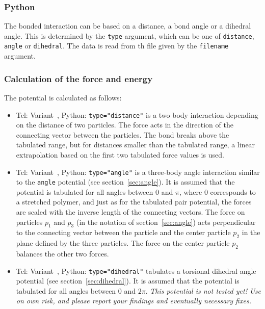 \subsubsection{Python}
\begin{pysyntax}
  \begin{features}
  \end{features}
\end{pysyntax}

The bonded interaction can be based on a distance, a bond angle or a dihedral angle. This is determined by the \texttt{type} argument, which can be one of \texttt{distance}, \texttt{angle} or \texttt{dihedral}. The data is read from th file given by the \texttt{filename} argument.

\subsubsection{Calculation of the force and energy}

The potential is calculated as follows:
\begin{itemize}
\item Tcl: Variant~, Python: \texttt{type="distance"} is a two body interaction depending on the distance of
  two particles. The force acts in the direction of the connecting vector
  between the particles. The bond breaks above the tabulated range, but for
  distances smaller than the tabulated range, a linear extrapolation based on
  the first two tabulated force values is used.
\item Tcl: Variant~, Python: \texttt{type="angle"} is a three-body angle interaction similar to the
  \texttt{angle} potential (see section~\ref{sec:angle}).  It is assumed that
  the potential is tabulated for all angles between 0 and $ \pi $, where 0
  corresponds to a stretched polymer, and just as for the tabulated pair
  potential, the forces are scaled with the inverse length of the connecting
  vectors. The force on particles $p_1$ and $p_3$ (in the notation of
  section~\ref{sec:angle}) acts perpendicular to the connecting vector between
  the particle and the center particle $p_2$ in the plane defined by the three
  particles. The force on the center particle $p_2$ balances the other two
  forces.
\item Tcl: Variant~, Python: \texttt{type="dihedral"} tabulates a torsional dihedral angle potential (see
  section~\ref{sec:dihedral}). It is assumed that the potential is tabulated for
  all angles between 0 and $2\pi$. \em{This potential is not tested yet! Use on
    own risk, and please report your findings and eventually necessary fixes.}
\end{itemize}


